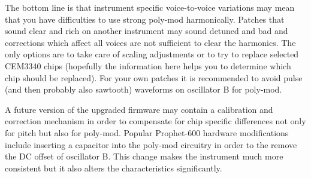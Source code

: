 The bottom line is that instrument specific voice-to-voice variations may mean that you have difficulties to use strong poly-mod harmonically. Patches that sound clear and rich on another instrument may sound detuned and bad and corrections which affect all voices are not sufficient to clear the harmonics. The only options are to take care of scaling adjustments or to try to replace selected CEM3340 chips (hopefully the information here helps you to determine which chip should be replaced). For your own patches it is recommended to avoid pulse (and then probably also sawtooth) waveforms on oscillator B for poly-mod.    

A future version of the upgraded firmware may contain a calibration and correction mechanism in order to compensate for chip specific differences not only for pitch but also for poly-mod. Popular Prophet-600 hardware modifications include inserting a capacitor into the poly-mod circuitry in order to the remove the DC offset of oscillator B. This change makes the instrument much more consistent but it also alters the characteristics significantly. 
